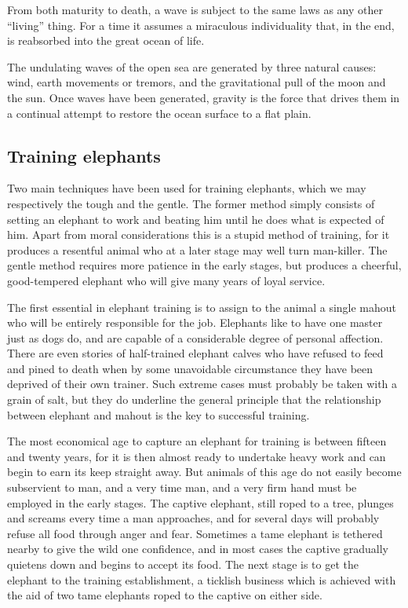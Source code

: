\documentclass[11pt]{article}
\begin{document}
From both maturity to death, a wave is subject to the same laws as any other ``living'' thing. For a time it assumes a miraculous individuality that, in the end, is reabsorbed into the great ocean of life.

The undulating waves of the open sea are generated by three natural causes: wind, earth movements or tremors, and the gravitational pull of the moon and the sun. Once waves have been generated, gravity is the force that drives them in a continual attempt to restore the ocean surface to a flat plain.
\subsection{Training elephants}
\label{sec-2-41}

Two main techniques have been used for training elephants, which we may respectively the tough and the gentle. The former method simply consists of setting an elephant to work and beating him until he does what is expected of him. Apart from moral considerations this is a stupid method of training, for it produces a resentful animal who at a later stage may well turn man-killer. The gentle method requires more patience in the early stages, but produces a cheerful, good-tempered elephant who will give many years of loyal service.

The first essential in elephant training is to assign to the animal a single mahout who will be entirely responsible for the job. Elephants like to have one master just as dogs do, and are capable of a considerable degree of personal affection. There are even stories of half-trained elephant calves who have refused to feed and pined to death when by some unavoidable circumstance they have been deprived of their own trainer. Such extreme cases must probably be taken with a grain of salt, but they do underline the general principle that the relationship between elephant and mahout is the key to successful training. 

The most economical age to capture an elephant for training is between fifteen and twenty years, for it is then almost ready to undertake heavy work and can begin to earn its keep straight away. But animals of this age do not easily become subservient to man, and a very time man, and a very firm hand must be employed in the early stages. The captive elephant, still roped to a tree, plunges and screams every time a man approaches, and for several days will probably refuse all food through anger and fear. Sometimes a tame elephant is tethered nearby to give the wild one confidence, and in most cases the captive gradually quietens down and begins to accept its food. The next stage is to get the elephant to the training establishment, a ticklish business which is achieved with the aid of two tame elephants roped to the captive on either side.
\end{document}
